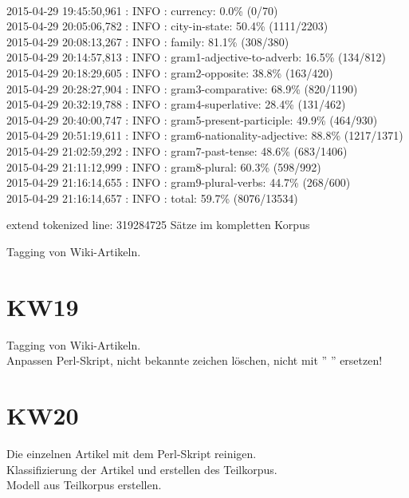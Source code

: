 \documentclass[11pt,a4paper]{article}
\begin{document}
\\2015-04-29 19:45:50,961 : INFO : currency: 0.0\% (0/70)
\\2015-04-29 20:05:06,782 : INFO : city-in-state: 50.4\% (1111/2203)
\\2015-04-29 20:08:13,267 : INFO : family: 81.1\% (308/380)
\\2015-04-29 20:14:57,813 : INFO : gram1-adjective-to-adverb: 16.5\% (134/812)
\\2015-04-29 20:18:29,605 : INFO : gram2-opposite: 38.8\% (163/420)
\\2015-04-29 20:28:27,904 : INFO : gram3-comparative: 68.9\% (820/1190)
\\2015-04-29 20:32:19,788 : INFO : gram4-superlative: 28.4\% (131/462)
\\2015-04-29 20:40:00,747 : INFO : gram5-present-participle: 49.9\% (464/930)
\\2015-04-29 20:51:19,611 : INFO : gram6-nationality-adjective: 88.8\% (1217/1371)
\\2015-04-29 21:02:59,292 : INFO : gram7-past-tense: 48.6\% (683/1406)
\\2015-04-29 21:11:12,999 : INFO : gram8-plural: 60.3\% (598/992)
\\2015-04-29 21:16:14,655 : INFO : gram9-plural-verbs: 44.7\% (268/600)
\\2015-04-29 21:16:14,657 : INFO : total: 59.7\% (8076/13534)

extend tokenized line: 319284725 Sätze im kompletten Korpus

Tagging von Wiki-Artikeln.
\section*{KW19}
Tagging von Wiki-Artikeln.
\\Anpassen Perl-Skript, nicht bekannte zeichen löschen, nicht mit '' '' ersetzen!

\section*{KW20}
Die einzelnen Artikel mit dem Perl-Skript reinigen.
\\Klassifizierung der Artikel und erstellen des Teilkorpus.
\\Modell aus Teilkorpus erstellen.
\end{document}
